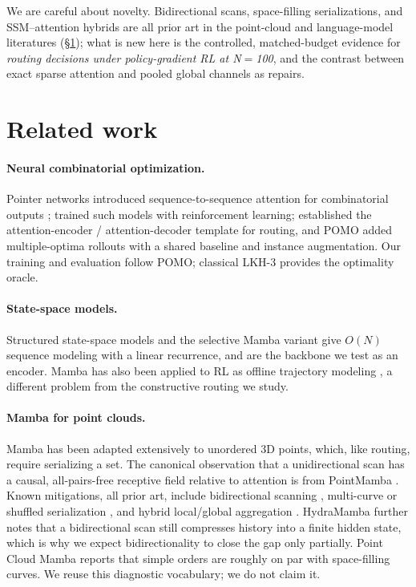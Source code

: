 \documentclass[11pt]{article}
\begin{document}
We are careful about novelty. Bidirectional scans, space-filling serializations,
and SSM--attention hybrids are all prior art in the point-cloud and language-model
literatures (\S\ref{sec:related}); what is new here is the controlled,
matched-budget evidence for \emph{routing decisions under policy-gradient RL at
N$=$100}, and the contrast between exact sparse attention and pooled global
channels as repairs.

\section{Related work}
\label{sec:related}

\paragraph{Neural combinatorial optimization.}
Pointer networks introduced sequence-to-sequence attention for combinatorial
outputs \citep{pointernet2015}; \citet{bello2016} trained such models with
reinforcement learning; \citet{kool2019} established the attention-encoder /
attention-decoder template for routing, and POMO \citep{pomo2020} added
multiple-optima rollouts with a shared baseline and instance augmentation. Our
training and evaluation follow POMO; classical LKH-3 \citep{lkh3} provides the
optimality oracle.

\paragraph{State-space models.}
Structured state-space models \citep{s4-2022} and the selective Mamba
variant \citep{mamba2023} give $O(N)$ sequence modeling with a linear recurrence,
and are the backbone we test as an encoder. Mamba has also been applied to RL as
offline trajectory modeling \citep{decisionmamba2024}, a different problem from
the constructive routing we study.

\paragraph{Mamba for point clouds.}
Mamba has been adapted extensively to unordered 3D points, which, like routing,
require serializing a set. The canonical observation that a unidirectional scan
has a causal, all-pairs-free receptive field relative to attention is from
PointMamba \citep{pointmamba2024}. Known mitigations, all prior art, include
bidirectional scanning \citep{vim2024,hydramamba2025,pamba2025}, multi-curve or
shuffled serialization \citep{ptv3-2024}, and hybrid local/global aggregation
\citep{pillarmamba2025}. HydraMamba \citep{hydramamba2025} further notes that a
bidirectional scan still compresses history into a finite hidden state, which is
why we expect bidirectionality to close the gap only partially. Point Cloud
Mamba \citep{pcm2025} reports that simple orders are roughly on par with
space-filling curves. We reuse this diagnostic vocabulary; we do not claim it.
\end{document}
